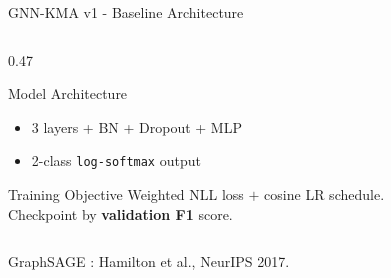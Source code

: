 \documentclass[aspectratio=169]{beamer}
\begin{document}
\begin{frame}{GNN-KMA v1 - Baseline Architecture}
\begin{columns}[T]
\begin{column}{0.47\textwidth}
\begin{block}{Model Architecture}
\begin{itemize}
					      (separate in / out / self terms)
					\item 3 layers + BN + Dropout + MLP
					\item 2-class \texttt{log-softmax} output
				\end{itemize}
			\end{block}
			\vspace{2pt}
			\begin{block}{Training Objective}
				Weighted NLL loss $+$ cosine LR schedule.\\
				Checkpoint by \textbf{validation F1} score.
			\end{block}
		\end{column}
	\end{columns}
	\vspace{2pt}
	{\scriptsize\color{gray}
		GraphSAGE \cite{hamilton2017}: Hamilton et al., NeurIPS 2017.}
\end{frame}
\end{document}
